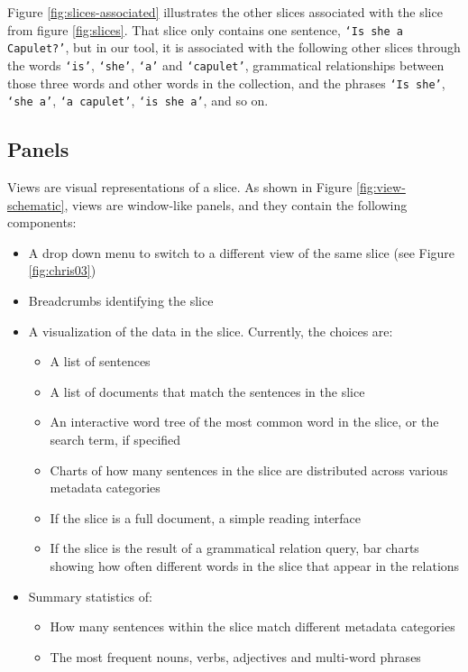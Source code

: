 \documentclass{sig-alternate}
\newcommand{\code}[1] {\texttt{#1}}
\begin{document}
Figure \ref{fig:slices-associated} illustrates the other slices associated with the slice from figure \ref{fig:slices}. That slice only contains one sentence, \code{`Is she a Capulet?'}, but in our tool, it is associated with the following other slices through the words \code{`is'}, \code{`she'}, \code{`a'} and \code{`capulet'}, grammatical relationships between those three words and other words in the collection, and the phrases \code{`Is she'}, \code{`she a'}, \code{`a capulet'},  \code{`is she a'}, and so on.


\subsection{Panels}
Views are visual representations of a slice. As shown in Figure \ref{fig:view-schematic},  views  are window-like panels, and they contain the following components:
\begin{itemize}
	\item A drop down menu to switch to a different view of the same slice (see Figure \ref{fig:chris03})
	\item Breadcrumbs identifying the slice
	\item A visualization of the data in the slice. Currently, the choices are:
		\begin{itemize}
			\item A list of sentences
			\item A list of documents that match the sentences in the slice
			\item An interactive word tree \cite{wattenberg_word_2008} of the most common word in the slice, or the search term, if specified
			\item Charts of how many sentences in the slice are distributed across various metadata categories
			\item If the slice is a full document, a simple reading interface
			\item If the slice is the result of a grammatical relation query, bar charts showing how often different words in the slice that appear in the relations
		\end{itemize}
	\item Summary statistics of:
		\begin{itemize}
			\item How many sentences within the slice match different metadata categories
			\item The most frequent nouns, verbs, adjectives and multi-word phrases
		\end{itemize}
\end{itemize}
\end{document}
